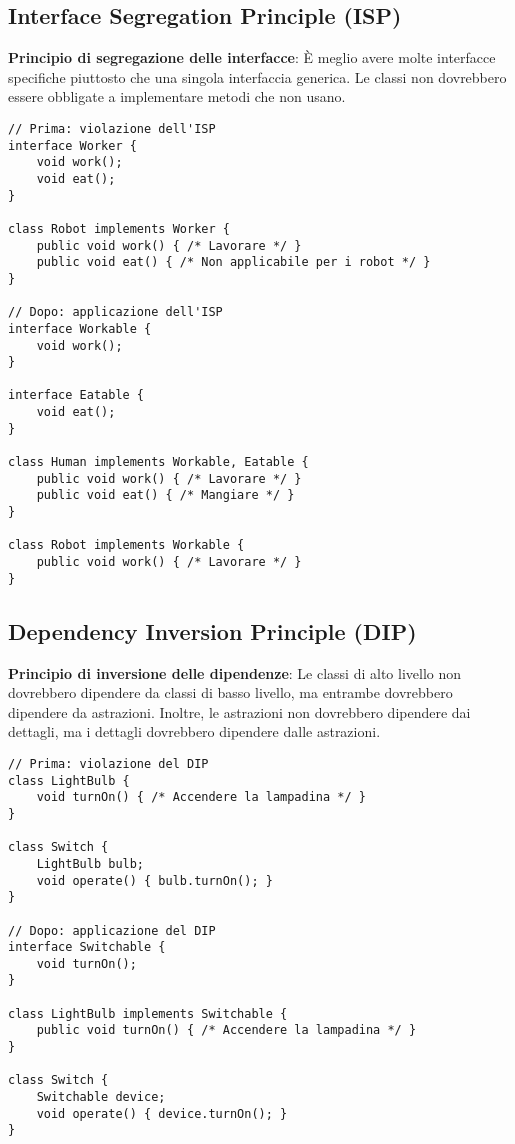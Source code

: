 \documentclass{article}
\begin{document}
\subsection{Interface Segregation Principle (ISP)}
\textbf{Principio di segregazione delle interfacce}: È meglio avere molte interfacce specifiche piuttosto che una singola interfaccia generica. Le classi non dovrebbero essere obbligate a implementare metodi che non usano.

\begin{lstlisting}
// Prima: violazione dell'ISP
interface Worker {
    void work();
    void eat();
}

class Robot implements Worker {
    public void work() { /* Lavorare */ }
    public void eat() { /* Non applicabile per i robot */ }
}

// Dopo: applicazione dell'ISP
interface Workable {
    void work();
}

interface Eatable {
    void eat();
}

class Human implements Workable, Eatable {
    public void work() { /* Lavorare */ }
    public void eat() { /* Mangiare */ }
}

class Robot implements Workable {
    public void work() { /* Lavorare */ }
}
\end{lstlisting}

\subsection{Dependency Inversion Principle (DIP)}
\textbf{Principio di inversione delle dipendenze}: Le classi di alto livello non dovrebbero dipendere da classi di basso livello, ma entrambe dovrebbero dipendere da astrazioni. Inoltre, le astrazioni non dovrebbero dipendere dai dettagli, ma i dettagli dovrebbero dipendere dalle astrazioni.

\begin{lstlisting}
// Prima: violazione del DIP
class LightBulb {
    void turnOn() { /* Accendere la lampadina */ }
}

class Switch {
    LightBulb bulb;
    void operate() { bulb.turnOn(); }
}

// Dopo: applicazione del DIP
interface Switchable {
    void turnOn();
}

class LightBulb implements Switchable {
    public void turnOn() { /* Accendere la lampadina */ }
}

class Switch {
    Switchable device;
    void operate() { device.turnOn(); }
}
\end{lstlisting}
\end{document}

